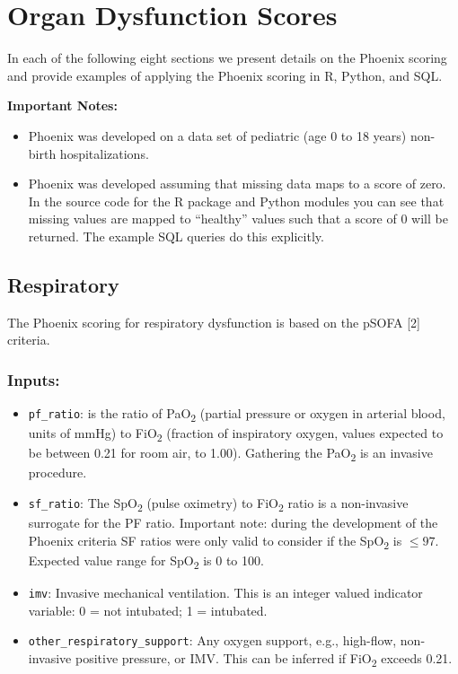 \documentclass[
  letterpaper,
  DIV=11,
  numbers=noendperiod]{scrartcl}
\begin{document}
\section{Organ Dysfunction Scores}\label{organ-dysfunction-scores}

In each of the following eight sections we present details on the
Phoenix scoring and provide examples of applying the Phoenix scoring in
R, Python, and SQL.

\textbf{Important Notes:}

\begin{itemize}
\item
  Phoenix was developed on a data set of pediatric (age 0 to 18 years)
  non-birth hospitalizations.
\item
  Phoenix was developed assuming that missing data maps to a score of
  zero. In the source code for the R package and Python modules you can
  see that missing values are mapped to ``healthy'' values such that a
  score of 0 will be returned. The example SQL queries do this
  explicitly.
\end{itemize}

\subsection{Respiratory}\label{respiratory}

The Phoenix scoring for respiratory dysfunction is based on the pSOFA
{[}2{]} criteria.

\subsubsection{Inputs:}\label{inputs}

\begin{itemize}
\item
  \texttt{pf\_ratio}: is the ratio of PaO\textsubscript{2} (partial
  pressure or oxygen in arterial blood, units of mmHg) to
  FiO\textsubscript{2} (fraction of inspiratory oxygen, values expected
  to be between 0.21 for room air, to 1.00). Gathering the
  PaO\textsubscript{2} is an invasive procedure.
\item
  \texttt{sf\_ratio}: The SpO\textsubscript{2} (pulse oximetry) to
  FiO\textsubscript{2} ratio is a non-invasive surrogate for the PF
  ratio. Important note: during the development of the Phoenix criteria
  SF ratios were only valid to consider if the SpO\textsubscript{2} is
  \(\leq 97\). Expected value range for SpO\textsubscript{2} is 0 to
  100.
\item
  \texttt{imv}: Invasive mechanical ventilation. This is an integer
  valued indicator variable: 0 = not intubated; 1 = intubated.
\item
  \texttt{other\_respiratory\_support}: Any oxygen support, e.g.,
  high-flow, non-invasive positive pressure, or IMV. This can be
  inferred if FiO\textsubscript{2} exceeds 0.21.
\end{itemize}
\end{document}
